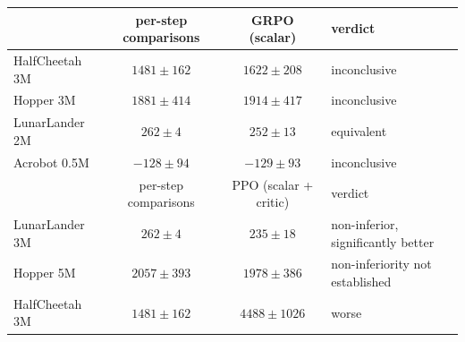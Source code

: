 \begin{tabular}{lccl}
\toprule
 & per-step comparisons & GRPO (scalar) & verdict \\
\midrule
HalfCheetah 3M & $1481\pm162$ & $1622\pm208$ & inconclusive \\
Hopper 3M & $1881\pm414$ & $1914\pm417$ & inconclusive \\
LunarLander 2M & $262\pm4$ & $252\pm13$ & equivalent \\
Acrobot 0.5M & $-128\pm94$ & $-129\pm93$ & inconclusive \\
\midrule
 & per-step comparisons & PPO (scalar + critic) & verdict \\
\midrule
LunarLander 3M & $262\pm4$ & $235\pm18$ & non-inferior, significantly better \\
Hopper 5M & $2057\pm393$ & $1978\pm386$ & non-inferiority not established \\
HalfCheetah 3M & $1481\pm162$ & $4488\pm1026$ & worse \\
\bottomrule
\end{tabular}

